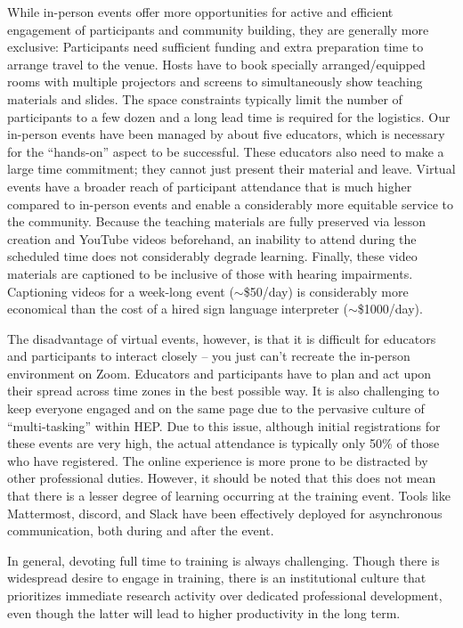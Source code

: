 \documentclass[twocolumn]{svjour3}          %
\begin{document}
While in-person events offer more opportunities for active and efficient engagement of participants and community building, they are generally more exclusive: Participants need sufficient funding and extra preparation time to arrange travel to the venue. Hosts have to book specially arranged/equipped rooms with multiple projectors and screens to simultaneously show teaching materials and slides. The space constraints typically limit the number of participants to a few dozen and a long lead time is required for the logistics.
Our in-person events have been managed by about five educators, which is necessary for the \enquote{hands-on} aspect to be successful. These educators also need to make a large time commitment; they cannot just present their material and leave.
Virtual events have a broader reach of participant attendance that is much higher compared to in-person events and enable a considerably more equitable service to the community. Because the teaching materials are fully preserved via lesson creation and YouTube videos beforehand, an inability to attend during the scheduled time does not considerably degrade learning.  Finally, these video materials are captioned to be inclusive of those with hearing impairments. Captioning videos for a week-long event ($\sim$\$50/day) is considerably more economical than the cost of a hired sign language interpreter ($\sim$\$1000/day).

The disadvantage of virtual events, however, is that it is difficult for educators and participants to interact closely -- you just can’t recreate the in-person environment on Zoom. Educators and participants have to plan and act upon their spread across time zones in the best possible way. It is also challenging to keep everyone engaged and on the same page due to the pervasive culture of \enquote{multi-tasking} within HEP. Due to this issue, although initial registrations for these events are very high, the actual attendance is typically only 50\% of those who have registered. The online experience is more prone to be distracted by other professional duties.
However, it should be noted that this does not mean that there is a lesser degree of learning occurring at the training event. Tools like Mattermost, discord, and Slack have been effectively deployed for asynchronous communication, both during and after the event.

In general, devoting full time to training is always challenging.  Though there is widespread desire to engage in training, there is an institutional culture that prioritizes immediate research activity over dedicated professional development, even though the latter will lead to higher productivity in the long term.
%
\end{document}
